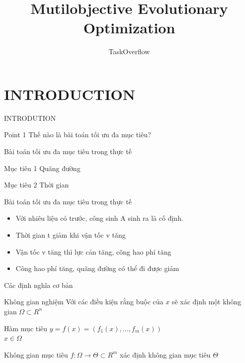 \documentclass{beamer}
\title{Mutilobjective Evolutionary Optimization}
\author{TaskOverflow}
\begin{document}
    \maketitle 


    \section{INTRODUCTION}
    \begin{frame}{INTRODUTION}
        \begin{block}{Point 1}
            Thế nào là bài toán tối ưu đa mục tiêu?
        \end{block}
    \end{frame}
    \begin{frame}{Bài toán tối ưu đa mục tiêu trong thực tế}
        \begin{block}{Mục tiêu 1}
            Quãng đường
        \end{block}
        \begin{block}{Mục tiêu 2}
            Thời gian
        \end{block}
    \end{frame}
    \begin{frame}{Bài toán tối ưu đa mục tiêu trong thực tế}
        \begin{itemize}
            \item <1-> Với nhiêu liệu có trước, công sinh A sinh ra là cố định.
            \item <2-> Thời gian t giảm khi vận tốc v tăng
            \item <3-> Vận tốc v tăng thì lực cản tăng, công hao phí tăng 
            \item <4-> Công hao phí tăng, quãng đường có thể đi được giảm
        \end{itemize}
    \end{frame}
    \begin{frame}{Các định nghĩa cơ bản}
        \begin{block}{Không gian nghiệm}
            Với các điều kiện rằng buộc của $x$ sẽ xác định một không gian $\Omega \subset R^{n}$
        \end{block}
        \pause
        \begin{block}{Hàm mục tiêu}
                $y = f(x)= (f_{1}(x),...,f_{m}(x))$
                \\$ x \in \Omega $
        \end{block}
        \pause
        \begin{block}{Không gian mục tiêu}
            $f : \Omega \to \Theta  \subset R^{m}$ xác định không gian mục tiêu $\Theta$
        \end{block}
    \end{frame}
\end{document}

